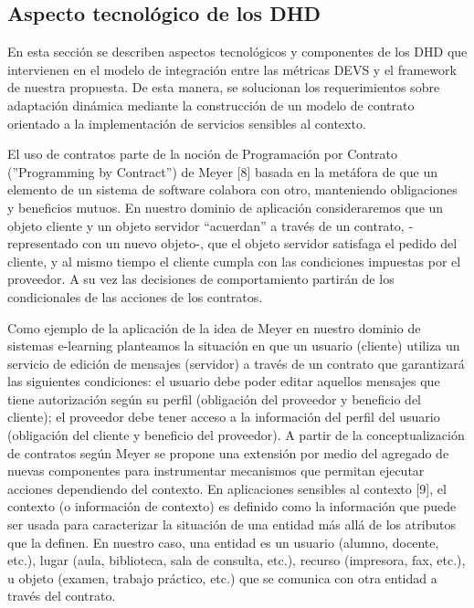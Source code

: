 \subsection{Aspecto tecnológico de los DHD}

En esta sección se describen aspectos tecnológicos y componentes de los DHD que
intervienen en el modelo de integración entre las métricas DEVS y el framework
de nuestra propuesta. De esta manera, se solucionan los requerimientos sobre
adaptación dinámica mediante la construcción de un modelo de contrato orientado
a la implementación de servicios sensibles al contexto.

El uso de contratos parte de la noción de Programación por Contrato
(”Programming by Contract”) de Meyer [8] basada en la metáfora de que un
elemento de un sistema de software colabora con otro, manteniendo obligaciones y
beneficios mutuos. En nuestro dominio de aplicación consideraremos que un objeto
cliente y un objeto servidor “acuerdan” a través de un contrato, -representado
con un nuevo objeto-, que el objeto servidor satisfaga el pedido del cliente, y
al mismo tiempo el cliente cumpla con las condiciones impuestas por el
proveedor. A su vez las decisiones de comportamiento partirán de los
condicionales de las acciones de los contratos.


Como ejemplo de la aplicación de la idea de Meyer en nuestro dominio de sistemas
e-learning planteamos la situación en que un usuario (cliente) utiliza un
servicio de edición de mensajes (servidor) a través de un contrato que
garantizará las siguientes condiciones: el usuario debe poder editar aquellos
mensajes que tiene autorización según su perfil (obligación del proveedor y
beneficio del cliente); el proveedor debe tener acceso a la información del
perfil del usuario (obligación del cliente y beneficio del proveedor).
A partir de la conceptualización de contratos según Meyer se propone una
extensión por medio del agregado de nuevas componentes para instrumentar
mecanismos que permitan ejecutar acciones dependiendo del contexto. En
aplicaciones sensibles al contexto [9], el contexto (o información de contexto)
es definido como la información que puede ser usada para caracterizar la
situación de una entidad más allá de los atributos que la definen. En nuestro
caso, una entidad es un usuario (alumno, docente, etc.), lugar (aula,
biblioteca, sala de consulta, etc.), recurso (impresora, fax, etc.), u objeto
(examen, trabajo práctico, etc.) que se comunica con otra entidad a través del
contrato.



